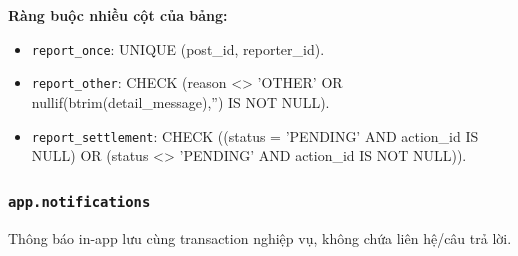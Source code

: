 \textbf{Ràng buộc nhiều cột của bảng:}

\begin{itemize}

\item \texttt{report\_\allowbreak{}once}: UNIQUE (post\_\allowbreak{}id,\allowbreak{} reporter\_\allowbreak{}id).

\item \texttt{report\_\allowbreak{}other}: CHECK (reason <> 'OTHER' OR nullif(btrim(detail\_\allowbreak{}message),\allowbreak{}'') IS NOT NULL).

\item \texttt{report\_\allowbreak{}settlement}: CHECK ((status = 'PENDING' AND action\_\allowbreak{}id IS NULL) OR (status <> 'PENDING' AND action\_\allowbreak{}id IS NOT NULL)).

\end{itemize}

\subsubsection*{\texttt{app.notifications}}

Thông báo in-app lưu cùng transaction nghiệp vụ,\allowbreak{} không chứa liên hệ/câu trả lời.

